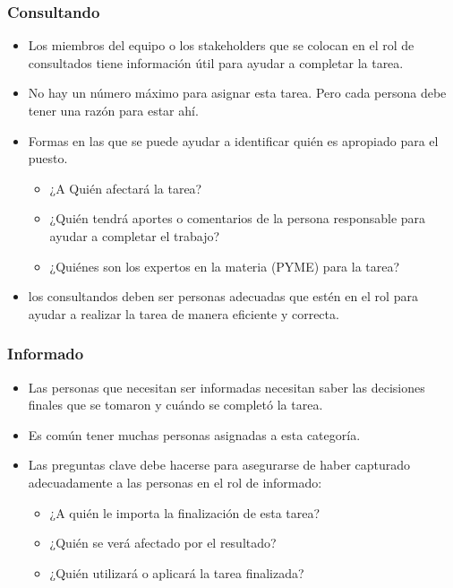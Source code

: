 \documentclass[10pt]{book}
\begin{document}
	    \subsubsection{Consultando}
	    \begin{itemize}
		\item Los miembros del equipo o los stakeholders que se colocan en el rol de consultados tiene información útil para ayudar a completar la tarea.
		\item No hay un número máximo para asignar esta tarea. Pero cada persona debe tener una razón para estar ahí.
		\item Formas en las que se puede ayudar a identificar quién es apropiado para el puesto.
		\begin{itemize}
		    \item ¿A Quién afectará la tarea?
		    \item ¿Quién tendrá aportes o comentarios de la persona responsable para ayudar a completar el trabajo?
		    \item ¿Quiénes son los expertos en la materia (PYME) para la tarea?
		\end{itemize}
		\item los consultandos deben ser personas adecuadas que estén en el rol para ayudar a realizar la tarea de manera eficiente y correcta.
	    \end{itemize}

	    \subsubsection{Informado}
	    \begin{itemize}
		\item Las personas que necesitan ser informadas necesitan saber las decisiones finales que se tomaron y cuándo se completó la tarea.
		\item Es común tener muchas personas asignadas a esta categoría.
		\item Las preguntas clave debe hacerse para asegurarse de haber capturado adecuadamente a las personas en el rol de informado:
		\begin{itemize}
		    \item ¿A quién le importa la finalización de esta tarea?
		    \item ¿Quién se verá afectado por el resultado?
		    \item ¿Quién utilizará o aplicará la tarea finalizada?
		\end{itemize}
	    \end{itemize}
\end{document}
